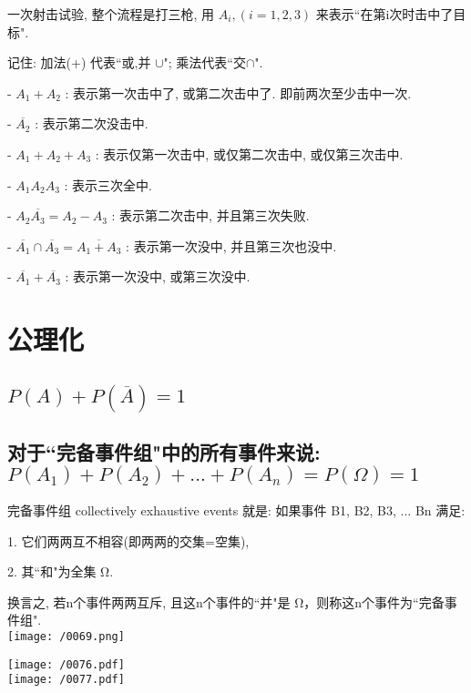 \documentclass[UTF8]{ctexart}
\begin{document}
	\begin{myEnvSample}
		一次射击试验, 整个流程是打三枪, 用 $A_i, (i=1,2,3)$ 来表示``在第i次时击中了目标".
		
		记住: 加法(+) 代表``或,并 $\cup$"; 乘法代表``交$\cap$".
		
		- $A_1+A_2$ : 表示第一次击中了, 或第二次击中了. 即前两次至少击中一次.
		
		- $	\overline{A_2}	$ : 表示第二次没击中.
		
		- $	A_1+A_2+A_3	$ : 表示仅第一次击中, 或仅第二次击中, 或仅第三次击中.
		
		- $	A_1A_2A_3	$ : 表示三次全中.
		
		- $	A_2\overline{A_3} = A_2 - A_3	$ : 表示第二次击中, 并且第三次失败.
		
		- $	\overline{A_1}\cap \overline{A_3}=\overline{A_1+A_3}$ : 表示第一次没中, 并且第三次也没中.
		
		- $	\overline{A_1}+\overline{A_3}	$ : 表示第一次没中, 或第三次没中.
		
		
	\end{myEnvSample}
	
	
	
	
	\section{公理化}
	
	\subsection{$P(A) + P(\overline{A}) = 1$}
	
	\subsection{对于``完备事件组"中的所有事件来说: $P(A_1) + P(A_2) + ... +  P(A_n) =  P(\Omega) = 1$}
	
	完备事件组 collectively exhaustive events 就是: 如果事件 B1, B2, B3, ...  Bn 满足:
	
	1. 它们两两互不相容(即两两的交集=空集),
	
	2. 其``和"为全集 Ω. 	
	
	换言之, 若n个事件两两互斥, 且这n个事件的``并"是 Ω，则称这n个事件为``完备事件组". \\
	
	\texttt{[image: /0069.png]}
	
	
	\begin{myEnvSample}
		\texttt{[image: /0076.pdf]} \\
		
		\texttt{[image: /0077.pdf]}
	\end{myEnvSample}
	\vspace{1em} 
	
\end{document}
